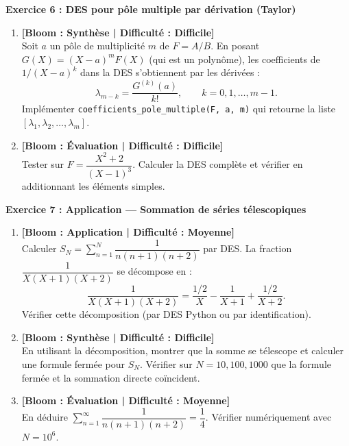 \vspace{0.3cm}

\noindent\textbf{Exercice 6 : DES pour pôle multiple par dérivation (Taylor)}
\begin{enumerate}
    \item \textbf{[Bloom : Synthèse | Difficulté : Difficile]} \\
    Soit $a$ un pôle de multiplicité $m$ de $F = A/B$. En posant $G(X) = (X - a)^m F(X)$ (qui est un polynôme), les coefficients de $1/(X-a)^k$ dans la DES s'obtiennent par les dérivées :
    \[ \lambda_{m - k} = \frac{G^{(k)}(a)}{k!}, \qquad k = 0, 1, \dots, m - 1. \]
    Implémenter \texttt{coefficients\_pole\_multiple(F, a, m)} qui retourne la liste $[\lambda_1, \lambda_2, \dots, \lambda_m]$.
    \item \textbf{[Bloom : Évaluation | Difficulté : Difficile]} \\
    Tester sur $F = \dfrac{X^2 + 2}{(X - 1)^3}$. Calculer la DES complète et vérifier en additionnant les éléments simples.
\end{enumerate}

\vspace{0.3cm}

\noindent\textbf{Exercice 7 : Application --- Sommation de séries télescopiques}
\begin{enumerate}
    \item \textbf{[Bloom : Application | Difficulté : Moyenne]} \\
    Calculer $\displaystyle S_N = \sum_{n=1}^{N} \dfrac{1}{n(n+1)(n+2)}$ par DES. La fraction $\dfrac{1}{X(X+1)(X+2)}$ se décompose en :
    \[ \frac{1}{X(X+1)(X+2)} = \frac{1/2}{X} - \frac{1}{X+1} + \frac{1/2}{X+2}. \]
    Vérifier cette décomposition (par DES Python ou par identification).
    \item \textbf{[Bloom : Synthèse | Difficulté : Difficile]} \\
    En utilisant la décomposition, montrer que la somme se télescope et calculer une formule fermée pour $S_N$. Vérifier sur $N = 10, 100, 1000$ que la formule fermée et la sommation directe coïncident.
    \item \textbf{[Bloom : Évaluation | Difficulté : Moyenne]} \\
    En déduire $\sum_{n=1}^{\infty} \dfrac{1}{n(n+1)(n+2)} = \dfrac{1}{4}$. Vérifier numériquement avec $N = 10^6$.
\end{enumerate}

\vspace{0.3cm}

